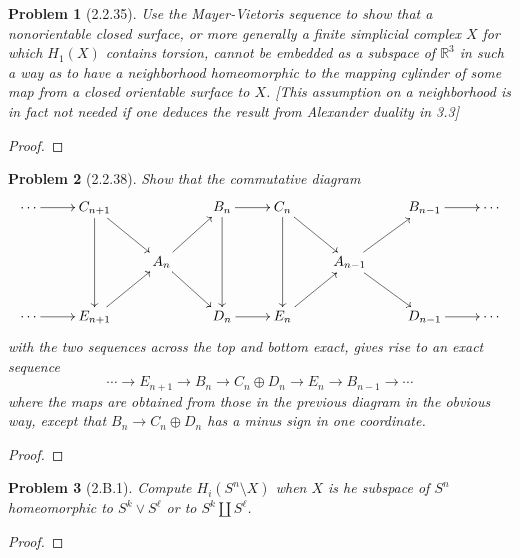 \documentclass[10pt]{article}
\newcommand{\sk}{\vskip 10mm}
\newcommand{\bb}[1]{\mathbb{#1}}
\theoremstyle{plain}
\newtheorem{problem}{Problem}
\theoremstyle{remark}
\begin{document}
\begin{problem}[2.2.35]
  Use the Mayer-Vietoris sequence to show that a
  nonorientable closed surface, or more generally
  a finite simplicial complex $X$ for which $H_1(X)$
  contains torsion, cannot be embedded as a subspace
  of $\bb{R}^3$ in such a way as to have a neighborhood
  homeomorphic to the mapping cylinder of some map from a
  closed orientable surface to $X$. [This assumption on a
  neighborhood is in fact not needed if one deduces the
  result from Alexander duality in 3.3]
\end{problem}

\begin{proof}
  
\end{proof}

\sk

\begin{problem}[2.2.38]
  Show that the commutative diagram
  \[
    \xymatrix{
      \cdots \ar[r] & C_{n+1} \ar[dd] \ar[rd] & & B_n \ar[dd] \ar[r] & C_n \ar[dd] \ar[rd] & & B_{n-1} \ar[r] &\cdots\\
      && A_n \ar[ru] \ar[rd] & && A_{n-1} \ar[ru] \ar[rd] & \\
      \cdots \ar[r] & E_{n+1} \ar[ru] & & D_n \ar[r] & E_n \ar[ru] & & D_{n-1} \ar[r] &\cdots\\
    }
  \]
  with the two sequences across the top and bottom exact,
  gives rise to an exact sequence
  \[
    \cdots\rightarrow E_{n+1}\rightarrow B_n\rightarrow C_n\oplus D_n\rightarrow E_n\rightarrow B_{n-1}\rightarrow\cdots
  \]
  where the maps are obtained from those in the previous
  diagram in the obvious way, except that $B_n\rightarrow C_n\oplus D_n$
  has a minus sign in one coordinate.
\end{problem}

\begin{proof}
  
\end{proof}

\sk

\begin{problem}[2.B.1]
  Compute $H_i(S^n\setminus X)$ when $X$ is he subspace of $S^n$ homeomorphic to
  $S^k\vee S^\ell$ or to $S^k\coprod S^\ell$.
\end{problem}

\begin{proof}
  
\end{proof}

\sk

\end{document}
